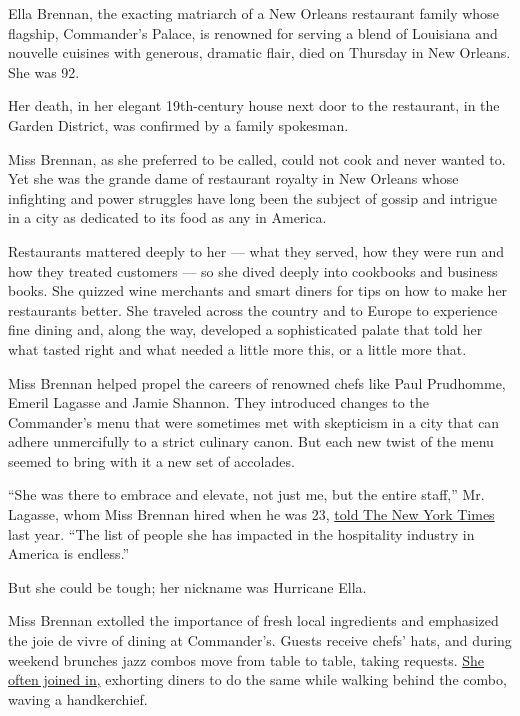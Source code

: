 Ella Brennan, the exacting matriarch of a New Orleans restaurant family
whose flagship, Commander's Palace, is renowned for serving a blend of
Louisiana and nouvelle cuisines with generous, dramatic flair, died on
Thursday in New Orleans. She was 92.

Her death, in her elegant 19th-century house next door to the
restaurant, in the Garden District, was confirmed by a family spokesman.

Miss Brennan, as she preferred to be called, could not cook and never
wanted to. Yet she was the grande dame of restaurant royalty in New
Orleans whose infighting and power struggles have long been the subject
of gossip and intrigue in a city as dedicated to its food as any in
America.

Restaurants mattered deeply to her --- what they served, how they were
run and how they treated customers --- so she dived deeply into
cookbooks and business books. She quizzed wine merchants and smart
diners for tips on how to make her restaurants better. She traveled
across the country and to Europe to experience fine dining and, along
the way, developed a sophisticated palate that told her what tasted
right and what needed a little more this, or a little more that.

Miss Brennan helped propel the careers of renowned chefs like Paul
Prudhomme, Emeril Lagasse and Jamie Shannon. They introduced changes to
the Commander's menu that were sometimes met with skepticism in a city
that can adhere unmercifully to a strict culinary canon. But each new
twist of the menu seemed to bring with it a new set of accolades.

``She was there to embrace and elevate, not just me, but the entire
staff,'' Mr. Lagasse, whom Miss Brennan hired when he was 23,
\href{https://www.nytimes3xbfgragh.onion/2017/03/27/dining/ella-brennan-new-orleans-restaurants.html}{told
The New York Times} last year. ``The list of people she has impacted in
the hospitality industry in America is endless.''

But she could be tough; her nickname was Hurricane Ella.

Miss Brennan extolled the importance of fresh local ingredients and
emphasized the joie de vivre of dining at Commander's. Guests receive
chefs' hats, and during weekend brunches jazz combos move from table to
table, taking requests.
\href{http://www.nola.com/dining/index.ssf/2018/05/ella_brennan_renowned_new_orle.html}{She
often joined in,} exhorting diners to do the same while walking behind
the combo, waving a handkerchief.

